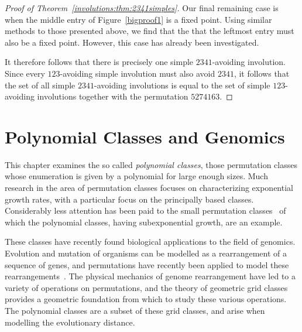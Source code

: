 \documentclass[12pt,twoside]{memoir}
\begin{document}
\begin{proof}[Proof of Theorem~\ref{involutions:thm:2341simples}]
          
          Our final remaining case is when the middle entry of
          Figure~\ref{bigproof1} is a fixed point. Using similar methods to those
          presented above, we find that the that the leftmost entry must also be
          a fixed point. However, this case has already been investigated. 

          
          It therefore follows that there is precisely one simple $2341$-avoiding
          involution.  Since every $123$-avoiding simple involution must also
          avoid $2341$, it follows that the set of all simple $2341$-avoiding
          involutions is equal to the set of simple $123$-avoiding involutions
          together with the permutation $5274163$. 
          
        \end{proof}



\cleardoublepage
\typeout{******************}
\typeout{******************}

  \chapter{Polynomial Classes and Genomics}
  \label{chap:polyclass}


    This chapter examines the so called \emph{polynomial classes}, those
    permutation classes whose enumeration is given by a polynomial for large
    enough sizes. Much research in the area of permutation classes focuses on
    characterizing exponential growth rates, with a particular
    focus on the principally based classes. Considerably less attention has been
    paid to the small permutation classes~\cite{Vatter2011,Vatter2010} of which the
    polynomial classes, having subexponential growth, are an example. 

    These classes have recently found biological applications to the field of
    genomics. Evolution and mutation of organisms can be modelled as a
    rearrangement of a sequence of genes, and permutations have recently been
    applied to model these rearrangements~\cite{GenomeBook}. The physical
    mechanics of genome rearrangement have led to a variety of operations on
    permutations, and the theory of geometric grid classes~\cite{GridClasses}
    provides a geometric foundation from which to study these various operations.
    The polynomial classes are a subset of these grid classes, and arise when
    modelling the evolutionary distance. 
\end{document}
